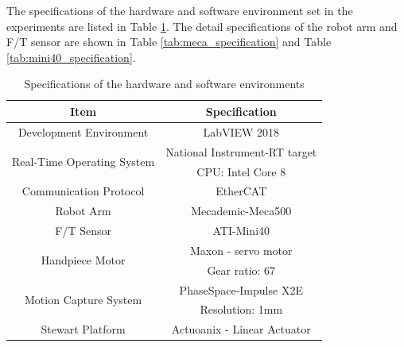 \par
The specifications of the hardware and software environment set in the experiments are listed in Table \ref{tab:exp_specification}. The detail specifications of the robot arm and F/T sensor are shown in Table \ref{tab:meca_specification} and Table \ref{tab:mini40_specification}.

\begin{table}[htbp]
\centering
\tabcolsep=20pt
\arrayrulewidth=1pt
\caption{Specifications of the hardware and software environments}
\label{tab:exp_specification}
\par
\begin{tabular}{|c|c|} 
\hline
\rowcolor{lightgray!40}Item						&Specification				\\	\hline
Development Environment							&LabVIEW 2018					\\	\hline
\multirow{2}{*}{Real-Time Operating System}		&National Instrument-RT target	\\
												&CPU: Intel Core 8				\\	\hline
Communication Protocol							&EtherCAT						\\	\hline
Robot Arm										&Mecademic-Meca500				\\	\hline
F/T Sensor										&ATI-Mini40						\\	\hline
\multirow{2}{*}{Handpiece Motor}							&Maxon - servo motor				\\
												&Gear ratio: 67					\\	\hline
\multirow{2}{*}{Motion Capture System}			&PhaseSpace-Impulse X2E 		\\
												&Resolution: 1mm				\\	\hline
Stewart Platform								&Actuoanix - Linear Actuator				\\	
\hline
\end{tabular}
\end{table}

